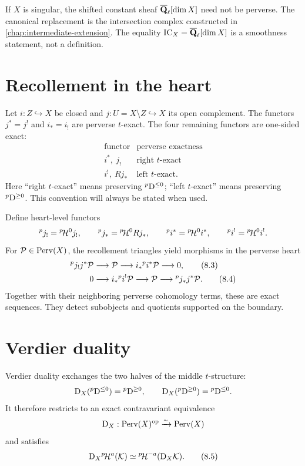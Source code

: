 \begin{warning}
If \(X\) is singular, the shifted constant sheaf \(\overline{\mathbf Q}_\ell[\dim X]\) need not be
perverse.  The canonical replacement is the intersection complex constructed
in \cref{chap:intermediate-extension}.  The equality
\(\operatorname{IC}_X=\overline{\mathbf Q}_\ell[\dim X]\) is a smoothness statement, not a definition.
\end{warning}

\section{Recollement in the heart}

Let \(i:Z\hookrightarrow X\) be closed and
\(j:U=X\setminus Z\hookrightarrow X\) its open complement.  The functors
\(j^*=j^!\) and \(i_*=i_!\) are perverse \(t\)-exact.  The four remaining
functors are one-sided exact:
\[
 \begin{array}{c|c}
 \text{functor}&\text{perverse exactness}\\
 \hline
 i^*,\ j_!&\text{right \(t\)-exact}\\
 i^!,\ Rj_*&\text{left \(t\)-exact}.
 \end{array}
\tag{8.2}\label{eq:recollement-exactness}
\]
Here “right \(t\)-exact” means preserving
\({}^p\mathrm D^{\leq0}\); “left \(t\)-exact” means preserving
\({}^p\mathrm D^{\geq0}\).  This convention will always be stated when used.

Define heart-level functors
\[
 {}^pj_!={}^{p}\!\mathcal H^0j_!,\qquad
 {}^pj_*={}^{p}\!\mathcal H^0Rj_*,\qquad
 {}^pi^*={}^{p}\!\mathcal H^0i^*,\qquad
 {}^pi^!={}^{p}\!\mathcal H^0i^!.
\]
For \(\mathcal P\in\operatorname{Perv}(X)\), the recollement triangles yield morphisms in the
perverse heart
\begin{align}
 {}^pj_!j^*\mathcal P&\longrightarrow\mathcal P\longrightarrow
      i_*{}^pi^*\mathcal P\longrightarrow0,
\tag{8.3}\label{eq:perverse-recollement-one}\\
 0&\longrightarrow i_*{}^pi^!\mathcal P\longrightarrow\mathcal P
      \longrightarrow{}^pj_*j^*\mathcal P.
\tag{8.4}\label{eq:perverse-recollement-two}
\end{align}
Together with their neighboring perverse cohomology terms, these are exact
sequences.  They detect subobjects and quotients supported on the boundary.

\section{Verdier duality}

\begin{theorem}
\label{thm:perverse-verdier-duality}
Verdier duality exchanges the two halves of the middle \(t\)-structure:
\[
 \mathrm D_X({}^p\mathrm D^{\leq0})={}^p\mathrm D^{\geq0},\qquad
 \mathrm D_X({}^p\mathrm D^{\geq0})={}^p\mathrm D^{\leq0}.
\]
It therefore restricts to an exact contravariant equivalence
\[
 \mathrm D_X:\operatorname{Perv}(X)^{\mathrm{op}}\xrightarrow{\sim}\operatorname{Perv}(X)
\]
and satisfies
\[
 \mathrm D_X{}^{p}\!\mathcal H^a(\mathcal K)\simeq{}^{p}\!\mathcal H^{-a}(\mathrm D_X\mathcal K).
\tag{8.5}\label{eq:duality-perverse-cohomology}
\]
\end{theorem}

